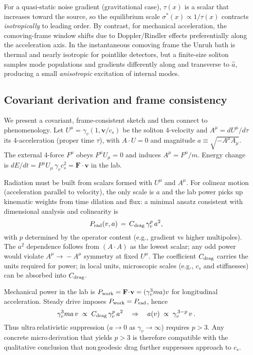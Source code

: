 \documentclass[11pt]{article}
\begin{document}
For a quasi-static noise gradient (gravitational case), $\tau(x)$ is a scalar that increases toward the source, so the equilibrium scale $\sigma^*(x)\propto 1/\tau(x)$ contracts \emph{isotropically} to leading order. By contrast, for mechanical acceleration, the comoving-frame window shifts due to Doppler/Rindler effects preferentially along the acceleration axis. In the instantaneous comoving frame the Unruh bath is thermal and nearly isotropic for pointlike detectors, but a finite-size soliton samples mode populations and gradients differently along and transverse to $\hat a$, producing a small \emph{anisotropic} excitation of internal modes.

\subsection{Covariant derivation and frame consistency}\label{si:drag-justify}
We present a covariant, frame-consistent sketch and then connect to phenomenology. Let $U^\mu=\gamma_v(1,\mathbf v/c_s)$ be the soliton 4-velocity and $A^\mu=dU^\mu/d\tau$ its 4-acceleration (proper time $\tau$), with $A\!\cdot\!U=0$ and magnitude $a\equiv\sqrt{-A^\mu A_\mu}$. The external 4-force $F^\mu$ obeys $F^\mu U_\mu=0$ and induces $A^\mu=F^\mu/m$. Energy change is $dE/dt = F^\mu U_\mu\,\gamma_v c_s^2= \mathbf F\!\cdot\!\mathbf v$ in the lab.

Radiation must be built from scalars formed with $U^\mu$ and $A^\mu$. For colinear motion (acceleration parallel to velocity), the only scale is $a$ and the lab power picks up kinematic weights from time dilation and flux: a minimal ansatz consistent with dimensional analysis and colinearity is
\begin{equation}
  P_{\rm rad}(v,a) \,=\, C_{\rm drag}\, \gamma_v^{p}\, a^{2},\label{eq:cov-prad}
\end{equation}
with $p$ determined by the operator content (e.g., gradient vs higher multipoles). The $a^2$ dependence follows from $(A\!\cdot\!A)$ as the lowest scalar; any odd power would violate $A^\mu\!\to\!-A^\mu$ symmetry at fixed $U^\mu$. The coefficient $C_{\rm drag}$ carries the units required for power; in local units, microscopic scales (e.g., $c_s$ and stiffnesses) can be absorbed into $C_{\rm drag}$.

Mechanical power in the lab is $P_{\rm work}=\mathbf F\!\cdot\!\mathbf v = (\gamma_v^3 m a) v$ for longitudinal acceleration. Steady drive imposes $P_{\rm work}=P_{\rm rad}$, hence
\begin{equation}
  \gamma_v^{3} m a\, v \;\propto\; C_{\rm drag}\, \gamma_v^{p}\, a^{2} \quad \Rightarrow \quad a(v) \;\propto\; \gamma_v^{\,3-p}\, v \,.
\end{equation}
Thus ultra\,relativistic suppression ($a\to0$ as $\gamma_v\to\infty$) requires $p>3$. Any concrete micro\,derivation that yields $p>3$ is therefore compatible with the qualitative conclusion that non\,geodesic drag further suppresses approach to $c_s$.
\end{document}

